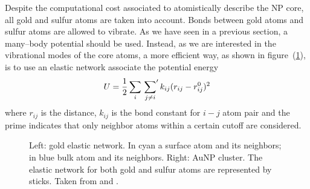 Despite the computational cost associated to atomistically describe the \ac{NP} core, all gold and sulfur atoms 
are taken into account. Bonds between gold atoms and sulfur atoms are allowed to vibrate. As we have seen in a 
previous section, a many--body potential should be used. Instead, as we are interested in the vibrational modes of 
the core atoms, 
a more efficient way, as shown in figure~(\ref{fig:coreNetwork}), is to use an elastic network associate the 
potential energy
\begin{equation*}
	U = \frac{1}{2}\sum_i \sideset{}{'}\sum_{j\ne i}k_{ij}(r_{ij} - r_{ij}^0)^2
\end{equation*}
where $r_{ij}$ is the distance, $k_{ij}$ is the bond constant for $i-j$ atom pair and the prime indicates that 
only neighbor atoms within a certain cutoff are considered. 
\begin{figure}[h!t]
	\centering%
	\qquad%
	\caption{Left: gold elastic network. In cyan a surface atom and its neighbors; in blue bulk atom and its neighbors. Right: \acs{AuNP} cluster. The elastic network for both gold and sulfur atoms are represented by sticks. Taken from \cite{simonelliThesis} and \cite{ourPaper}.}
	\label{fig:coreNetwork}
\end{figure}

